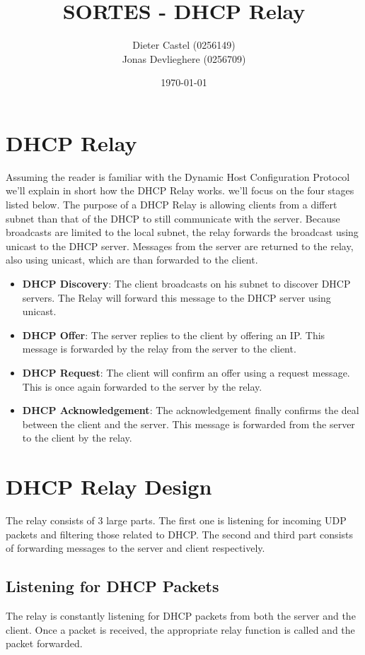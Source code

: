 \documentclass[11pt]{article}
\title{SORTES - DHCP Relay}
\author{Dieter Castel (0256149) \\ Jonas Devlieghere (0256709)}
\date{\today}
\begin{document}
\maketitle
\newpage

\tableofcontents
\newpage

\section{DHCP Relay}
Assuming the reader is familiar with the Dynamic Host Configuration Protocol
we'll explain in short how the DHCP Relay works. we'll focus on the four stages
listed below. The purpose of a DHCP Relay is allowing clients from a differt
subnet than that of the DHCP to still communicate with the server. Because
broadcasts are limited to the local subnet, the relay forwards the broadcast
using unicast to the DHCP server. Messages from the server are returned to the
relay, also using unicast, which are than forwarded to the client.

\begin{itemize}
	\item \textbf{DHCP Discovery}: The client broadcasts on his subnet to discover DHCP servers. The Relay will forward this message to the DHCP server using unicast.
	\item \textbf{DHCP Offer}: The server replies to the client by offering an IP. This message is forwarded by the relay from the server to the client.
	\item \textbf{DHCP Request}: The client will confirm an offer using a request message. This is once again forwarded to the server by the relay.
	\item \textbf{DHCP Acknowledgement}: The acknowledgement finally confirms
	the deal between the client and the server. This message is forwarded from
	the server to the client by the relay.
\end{itemize}

\section{DHCP Relay Design}
The relay consists of 3 large parts. The first one is listening for incoming UDP
packets and filtering those related to DHCP. The second and third part consists
of forwarding messages to the server and client respectively.

\subsection{Listening for DHCP Packets}
The relay is constantly listening for DHCP packets from both the server and the
client. Once a packet is received, the appropriate relay function is called and
the packet forwarded.
\end{document}
